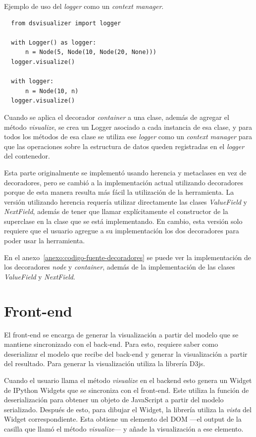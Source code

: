 \begin{listing}[h]
  \caption{Ejemplo de uso del \textit{logger} como un \textit{context manager}.}
  \label{lst:ejemplo-logger-ctx-mgr}
  \begin{verbatim}
  from dsvisualizer import logger
  
  with Logger() as logger:
      n = Node(5, Node(10, Node(20, None)))
  logger.visualize()
  
  with logger:
      n = Node(10, n)
  logger.visualize()
  \end{verbatim}
\end{listing}

Cuando se aplica el decorador \textit{container} a una clase, además de agregar el método \textit{visualize}, se crea un Logger asociado a cada instancia de esa clase, y para todos los métodos de esa clase se utiliza ese \textit{logger} como un \textit{context manager} para que las operaciones sobre la estructura de datos queden registradas en el \textit{logger} del contenedor.

Esta parte originalmente se implementó usando herencia y metaclases en vez de decoradores, pero se cambió a la implementación actual utilizando decoradores porque de esta manera resulta más fácil la utilización de la herramienta. La versión utilizando herencia requería utilizar directamente las clases \textit{ValueField} y \textit{NextField}, además de tener que llamar explícitamente el constructor de la superclase en la clase que se está implementando. En cambio, esta versión solo requiere que el usuario agregue a su implementación los dos decoradores para poder usar la herramienta.

En el anexo~\ref{anexo:codigo-fuente-decoradores} se puede ver la implementación de los decoradores \textit{node} y \textit{container}, además de la implementación de las clases \textit{ValueField} y \textit{NextField}.

\section{Front-end}

El front-end se encarga de generar la visualización a partir del modelo que se mantiene sincronizado con el back-end. Para esto, requiere saber como deserializar el modelo que recibe del back-end y generar la visualización a partir del resultado. Para generar la visualización utiliza la librería D3js.

Cuando el usuario llama el método \textit{visualize} en el backend esto genera un Widget de IPython Widgets que se sincroniza con el front-end. Este utiliza la función de deserialización para obtener un objeto de JavaScript a partir del modelo serializado. Después de esto, para dibujar el Widget, la librería utiliza la \textit{vista} del Widget correspondiente. Esta obtiene un elemento del DOM ---el output de la casilla que llamó el método \textit{visualize}--- y añade la visualización a ese elemento.

